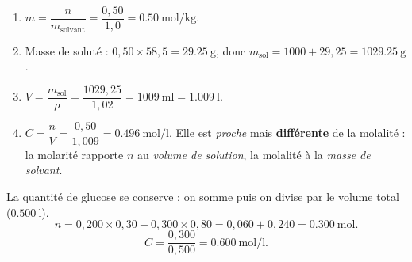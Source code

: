 \documentclass[11pt,a4paper]{article}
\begin{document}
\begin{corrige}
\begin{enumerate}[label=\alph*)]
  \item $m = \dfrac{n}{m_{\text{solvant}}} = \dfrac{0{,}50}{1{,}0} = \SI{0.50}{\mole\per\kilo\gram}$.
  \item Masse de soluté : $0{,}50\times 58{,}5 = \SI{29.25}{\gram}$, donc
        $m_{\text{sol}} = 1000 + 29{,}25 = \SI{1029.25}{\gram}$.
  \item $V = \dfrac{m_{\text{sol}}}{\rho} = \dfrac{1029{,}25}{1{,}02} = \SI{1009}{\milli\litre} = \SI{1.009}{\litre}$.
  \item $C = \dfrac{n}{V} = \dfrac{0{,}50}{1{,}009} = \SI{0.496}{\mole\per\litre}$. Elle est \emph{proche}
        mais \textbf{différente} de la molalité : la molarité rapporte $n$ au \emph{volume de solution},
        la molalité à la \emph{masse de solvant}.
\end{enumerate}
\end{corrige}

\begin{corrige}
La quantité de glucose se conserve ; on somme puis on divise par le volume total ($\SI{0.500}{\litre}$).
\[ n = 0{,}200\times 0{,}30 + 0{,}300\times 0{,}80 = 0{,}060 + 0{,}240 = \SI{0.300}{\mole}. \]
\[ C = \frac{0{,}300}{0{,}500} = \SI{0.600}{\mole\per\litre}. \]
\end{corrige}
\end{document}
